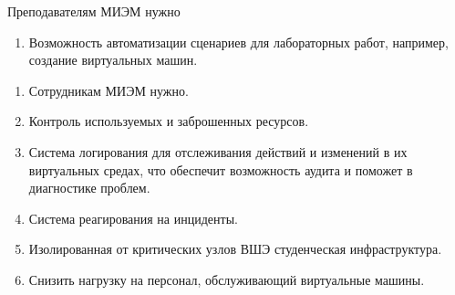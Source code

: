 \documentclass[14pt, a4paper]{extarticle}
\begin{document}
Преподавателям МИЭМ нужно

\begin{enumerate}
\item Возможность автоматизации сценариев для лабораторных работ, например, создание виртуальных машин.
\end{enumerate}

\begin{enumerate}
\item Сотрудникам МИЭМ нужно.
\item Контроль используемых и заброшенных ресурсов.
\item Система логирования для отслеживания действий и изменений в их виртуальных средах, что обеспечит возможность аудита и поможет в диагностике проблем.
\item Система реагирования на инциденты.
\item Изолированная от критических узлов ВШЭ студенческая инфраструктура.
\item Снизить нагрузку на персонал, обслуживающий виртуальные машины.
\end{enumerate}
\end{document}

